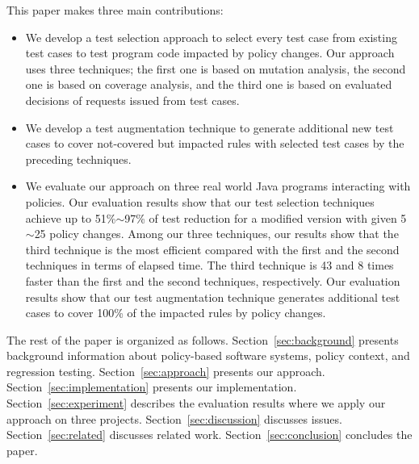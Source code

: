 


This paper makes three main contributions:

\begin{itemize}
  \item We develop a test selection approach to select every test case from existing test cases to test program code impacted by policy changes. Our approach
  uses three techniques; the first one is based on mutation analysis, the second one is based on coverage analysis, and the third one is based on evaluated 
decisions of requests issued from test cases. 
  \item We develop a test augmentation technique to generate additional new test cases to cover not-covered but impacted rules with selected test cases by the preceding techniques.

  \item We evaluate our approach on three real world Java programs interacting with policies. Our evaluation results show that our test selection techniques achieve
 up to 51\%$\sim$97\% of test reduction for a modified version with given 5$\sim$25 policy changes. Among our three techniques, our results show that the 
third technique is the most efficient compared with the first
  and the second techniques in terms of elapsed time. The third technique is 43 and 8 times
faster than the first and the second techniques, respectively. Our evaluation results show that our test augmentation technique generates additional test cases to cover 100\% of the impacted rules by policy changes.
\end{itemize}

The rest of the paper is organized as follows.
Section~\ref{sec:background} presents background information about
policy-based software systems, policy context, and regression testing.
Section~\ref{sec:approach} presents our approach.
Section~\ref{sec:implementation} presents our implementation. 
Section~\ref{sec:experiment} describes the evaluation results
where we apply our approach on three projects.
Section~\ref{sec:discussion} discusses issues. 
Section~\ref{sec:related} discusses related
work. Section~\ref{sec:conclusion}
concludes the paper.